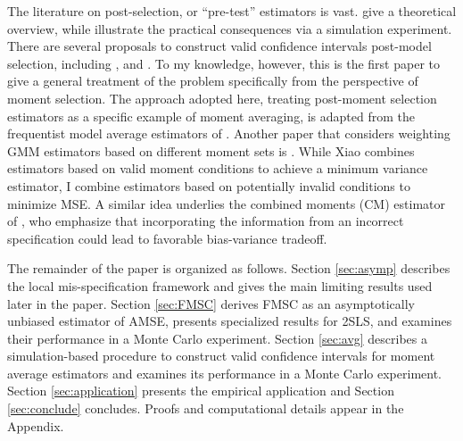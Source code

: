 The literature on post-selection, or ``pre-test'' estimators is vast. 
\citet{LeebPoetscher2005, LeebPoetscher2009}  give a theoretical overview, while \cite{Demetrescu} illustrate the practical consequences via a simulation experiment. 
There are several proposals to construct valid confidence intervals post-model selection, including \cite{Kabaila1998}, \cite{HjortClaeskens} and \cite{KabailaLeeb2006}. 
To my knowledge, however, this is the first paper to give a general treatment of the problem specifically from the perspective of moment selection. 
The approach adopted here, treating post-moment selection estimators as a specific example of moment averaging, is adapted from the frequentist model average estimators of \cite{HjortClaeskens}.
Another paper that considers weighting GMM estimators based on different moment sets is \cite{Xiao}. 
While Xiao combines estimators based on valid moment conditions to achieve a minimum variance estimator, I combine estimators based on potentially invalid conditions to minimize MSE. 
A similar idea underlies the combined moments (CM) estimator of \cite{Judge2007}, who emphasize that incorporating the information from an incorrect specification could lead to favorable bias-variance tradeoff. 

The remainder of the paper is organized as follows.
Section \ref{sec:asymp} describes the local mis-specification framework and gives the main limiting results used later in the paper. 
Section \ref{sec:FMSC} derives FMSC as an asymptotically unbiased estimator of AMSE, presents specialized results for 2SLS, and examines their performance in a Monte Carlo experiment. 
Section \ref{sec:avg} describes a simulation-based procedure to construct valid confidence intervals for moment average estimators and examines its performance in a Monte Carlo experiment. Section \ref{sec:application} presents the empirical application and Section \ref{sec:conclude} concludes.
Proofs and computational details appear in the Appendix.